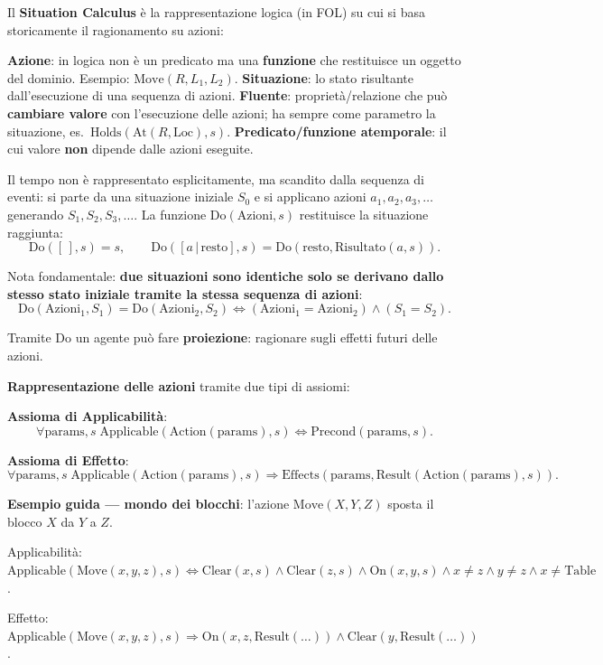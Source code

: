 \documentclass[11pt,a4paper]{report}
\begin{document}
Il \textbf{Situation Calculus} è la rappresentazione logica (in FOL) su cui si basa storicamente il ragionamento su azioni:

\textbf{Azione}: in logica non è un predicato ma una \textbf{funzione} che restituisce un oggetto del dominio. Esempio: $\text{Move}(R,L_1,L_2)$. \textbf{Situazione}: lo stato risultante dall'esecuzione di una sequenza di azioni. \textbf{Fluente}: proprietà/relazione che può \textbf{cambiare valore} con l'esecuzione delle azioni; ha sempre come parametro la situazione, es.\ $\text{Holds}(\text{At}(R,\text{Loc}),s)$. \textbf{Predicato/funzione atemporale}: il cui valore \textbf{non} dipende dalle azioni eseguite.

Il tempo non è rappresentato esplicitamente, ma scandito dalla sequenza di eventi: si parte da una situazione iniziale $S_0$ e si applicano azioni $a_1,a_2,a_3,\dots$ generando $S_1,S_2,S_3,\dots$. La funzione $\text{Do}(\text{Azioni},s)$ restituisce la situazione raggiunta:
\[
\text{Do}([\,],s) = s, \qquad \text{Do}([a\,|\,\text{resto}],s) = \text{Do}(\text{resto}, \text{Risultato}(a,s)).
\]

Nota fondamentale: \textbf{due situazioni sono identiche solo se derivano dallo stesso stato iniziale tramite la stessa sequenza di azioni}:
\[
\text{Do}(\text{Azioni}_1,S_1) = \text{Do}(\text{Azioni}_2,S_2) \Leftrightarrow (\text{Azioni}_1{=}\text{Azioni}_2) \wedge (S_1{=}S_2).
\]

Tramite $\text{Do}$ un agente può fare \textbf{proiezione}: ragionare sugli effetti futuri delle azioni.

\textbf{Rappresentazione delle azioni} tramite due tipi di assiomi:

\textbf{Assioma di Applicabilità}:
\[
\forall \text{params},s\; \text{Applicable}(\text{Action}(\text{params}),s) \Leftrightarrow \text{Precond}(\text{params},s).
\]

\textbf{Assioma di Effetto}:
\[
\forall \text{params},s\; \text{Applicable}(\text{Action}(\text{params}),s) \Rightarrow \text{Effects}(\text{params}, \text{Result}(\text{Action}(\text{params}),s)).
\]

\textbf{Esempio guida --- mondo dei blocchi}: l'azione $\text{Move}(X,Y,Z)$ sposta il blocco $X$ da $Y$ a $Z$.

Applicabilità: $\text{Applicable}(\text{Move}(x,y,z),s) \Leftrightarrow \text{Clear}(x,s)\wedge\text{Clear}(z,s)\wedge\text{On}(x,y,s)\wedge x{\ne}z\wedge y{\ne}z\wedge x{\ne}\text{Table}$.

Effetto: $\text{Applicable}(\text{Move}(x,y,z),s) \Rightarrow \text{On}(x,z,\text{Result}(\dots))\wedge\text{Clear}(y,\text{Result}(\dots))$.
\end{document}
